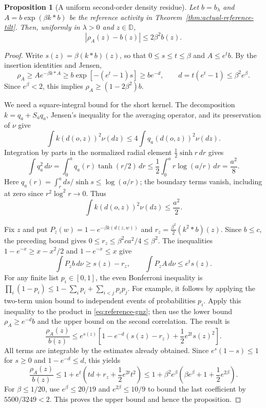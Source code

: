 \documentclass[11pt]{article}
\newtheorem{proposition}[theorem]{Proposition}
\theoremstyle{remark}\newtheorem{remark}[theorem]{Remark}
\begin{document}
\begin{proposition}[A uniform second-order density residue]
\label{prop:reference-density-residue}
Let $b=b_\lambda$ and $A=b\exp(\beta k*b)$ be the reference activity
in Theorem~\ref{thm:actual-reference-tilt}.  Then, uniformly in
$\lambda>0$ and $z\in\mathbb D$,
\begin{equation}\label{eq:reference-density-residue}
 |\rho_A(z)-b(z)|\le2\beta^2 b(z).
\end{equation}
\end{proposition}
\begin{proof}
Write $s(z)=\beta(k*b)(z)$, so that $0\le s\le t\le\beta$ and
$A\le e^t b$.  By the insertion identities and Jensen,
\[
 \rho_A\ge A e^{-\beta k*A}
 \ge b\exp[-(e^t-1)s]\ge b e^{-d},
 \qquad d=t(e^t-1)\le\beta^2e^\beta.
\]
Since $e^\beta<2$, this implies $\rho_A\ge(1-2\beta^2)b$.

We need a square-integral bound for the short kernel.  The decomposition
$k=q_a+S_aq_a$, Jensen's inequality for the averaging operator, and its
preservation of $\nu$ give
\[
 \int k(d(o,z))^2\nu(dz)\le4\int q_a(d(o,z))^2\nu(dz).
\]
Integration by parts in the normalized radial element
$\frac12\sinh r\,dr$ gives
\[
 \int q_a^2\,d\nu
 =\int_0^a q_a(r)\tanh(r/2)\,dr
 \le\frac12\int_0^a r\log(a/r)\,dr=\frac{a^2}{8}.
\]
Here $q_a(r)=\int_r^a ds/\sinh s\le\log(a/r)$; the boundary terms
vanish, including at zero since $r^2\log^2r\to0$.  Thus
\begin{equation}\label{eq:reference-k-square}
 \int k(d(o,z))^2\nu(dz)\le\frac{a^2}{2}.
\end{equation}

Fix $z$ and put $P_z(w)=1-e^{-\beta k(d(z,w))}$ and
$r_z=\frac{\beta^2}{2}(k^2*b)(z)$.  Since $b\le c$, the preceding
bound gives $0\le r_z\le\beta^2ca^2/4\le\beta^2$.
The inequalities $1-e^{-x}\ge x-x^2/2$ and $1-e^{-x}\le x$ give
\[
 \int P_z b\,d\nu\ge s(z)-r_z,
 \qquad \int P_z A\,d\nu\le e^t s(z).
\]
For any finite list $p_i\in[0,1]$, the even Bonferroni inequality is
$\prod_i(1-p_i)\le1-\sum_i p_i+\sum_{i<j}p_ip_j$.
For example, it follows by applying the two-term union bound to
independent events of probabilities $p_i$.  Apply this inequality to
the product in \eqref{eq:reference-gnz}; then use the lower bound
$\rho_A\ge e^{-d}b$ and the upper bound on the second correlation.
The result is
\[
 \frac{\rho_A(z)}{b(z)}
 \le e^{s(z)}\left[1-e^{-d}(s(z)-r_z)
                         +\frac12e^{2t}s(z)^2\right].
\]
All terms are integrable by the estimates already obtained.  Since
$e^s(1-s)\le1$ for $s\ge0$ and $1-e^{-d}\le d$, this yields
\[
 \frac{\rho_A(z)}{b(z)}
 \le1+e^t\left(td+r_z+\frac12e^{2t}t^2\right)
 \le1+\beta^2 e^\beta
                    \left(\beta e^\beta+1+\frac12e^{2\beta}\right).
\]
For $\beta\le1/20$, use $e^\beta\le20/19$ and
$e^{2\beta}\le10/9$ to bound the last coefficient by
$5500/3249<2$.  This proves the upper bound and hence the proposition.
\end{proof}
\end{document}
